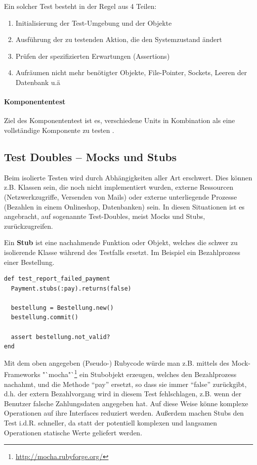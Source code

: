 Ein solcher Test besteht in der Regel aus 4 Teilen:
\begin{enumerate}
 \item Initialisierung der Test-Umgebung und der Objekte
 \item Ausführung der zu testenden Aktion, die den Systemzustand ändert
 \item Prüfen der spezifizierten Erwartungen (Assertions)
 \item Aufräumen nicht mehr benötigter Objekte, File-Pointer, Sockets, Leeren der Datenbank u.ä 
\end{enumerate}

\paragraph{Komponententest}
Ziel des Komponententest ist es, verschiedene Units in Kombination als eine vollständige Komponente zu testen \citep{goodliffe_code_2006}.

 \subsection{Test Doubles -- Mocks und Stubs}
  \label{sec:mocks}
  Beim isolierte Testen wird durch Abhängigkeiten aller Art erschwert. Dies können z.B. Klassen sein, die noch nicht implementiert wurden, externe Ressourcen (Netzwerkzugriffe, Versenden von Mails) oder externe unterliegende Prozesse (Bezahlen in einem Onlineshop, Datenbanken) sein. In diesen Situationen ist es angebracht, auf sogenannte Test-Doubles, meist Mocks und Stubs, zurückzugreifen.
  
  Ein \textbf{Stub} ist eine nachahmende Funktion oder Objekt, welches die schwer zu isolierende Klasse während des Testfalls ersetzt. Im Beispiel ein Bezahlprozess einer Bestellung.
  \begin{lstlisting}
def test_report_failed_payment
  Payment.stubs(:pay).returns(false)
  
  bestellung = Bestellung.new()
  bestellung.commit()
  
  assert bestellung.not_valid?
end
  \end{lstlisting}
  Mit dem oben angegeben (Pseudo-) Rubycode würde man z.B. mittels des Mock-Frameworks "`mocha"`\footnote{\url{http://mocha.rubyforge.org/}} ein Stubobjekt erzeugen, welches den Bezahlprozess nachahmt, und die Methode "`pay"' ersetzt, so dass sie immer "`false"' zurückgibt, d.h. der extern Bezahlvorgang wird in diesem Test fehlschlagen, z.B. wenn der Benutzer falsche Zahlungsdaten angegeben hat. Auf diese Weise könne komplexe Operationen auf ihre Interfaces reduziert werden. Außerdem machen Stubs den Test i.d.R. schneller, da statt der potentiell komplexen und langsamen Operationen statische Werte geliefert werden.
  
